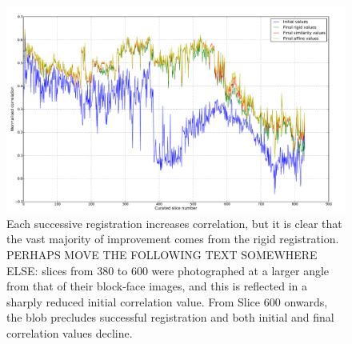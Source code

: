       \begin{figure}
        \centering
        \includegraphics[width=\textheight]{Ch6/Figs/diagnostics/initial_and_final_values_comparison}
        \caption{Each successive registration increases correlation, but it is clear that the vast majority of improvement comes from the rigid registration. PERHAPS MOVE THE FOLLOWING TEXT SOMEWHERE ELSE: slices from 380 to 600 were photographed at a larger angle from that of their block-face images, and this is reflected in a sharply reduced initial correlation value. From Slice 600 onwards, the blob precludes successful registration and both initial and final correlation values decline.}
        \label{fig:initial_and_final_values_comparison}
      \end{figure}
      
